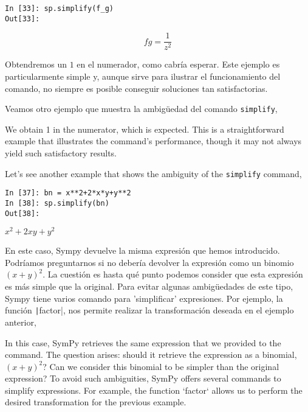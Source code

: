 \begin{center}
	\begin{minipage}{.25\textwidth}
		\begin{verbatim}
In [33]: sp.simplify(f_g)
Out[33]: 
		\end{verbatim}
	\end{minipage}
	\begin{equation*}
		fg = \frac{1}{z^2}
	\end{equation*}
\end{center}
\begin{paracol}{2}
Obtendremos un $1$ en el numerador, como cabría esperar. Este ejemplo es particularmente simple y, aunque sirve para ilustrar el funcionamiento del comando, no siempre es posible conseguir soluciones tan satisfactorias.

Veamos otro ejemplo que muestra la ambigüedad del comando \texttt{simplify},

\switchcolumn
We obtain 1 in the numerator, which is expected. This is a straightforward example that illustrates the command's performance, though it may not always yield such satisfactory results.

Let's see another example that shows the ambiguity of the \texttt{simplify} command,
\end{paracol}
\begin{center}
	\begin{minipage}{.25\textwidth}
		\begin{verbatim}
In [37]: bn = x**2+2*x*y+y**2
In [38]: sp.simplify(bn)
Out[38]:
		\end{verbatim}
		$x^2+2xy+y^2$
	\end{minipage}
\end{center}
\begin{paracol}{2}
En este caso, Sympy devuelve la misma expresión que hemos introducido. Podríamos preguntarnos si no debería devolver la expresión como un binomio $(x+y)^2$. La cuestión es hasta qué punto podemos consider que esta expresión es más simple que la original. Para evitar algunas ambigüedades de este tipo, Sympy tiene varios comando para 'simplificar' expresiones. Por ejemplo, la función \texttt|factor|, nos permite realizar la transformación deseada en el ejemplo anterior,

\switchcolumn
In this case, SymPy retrieves the same expression that we provided to the command. The question arises: should it retrieve the expression as a binomial, \((x+y)^2\)? Can we consider this binomial to be simpler than the original expression? To avoid such ambiguities, SymPy offers several commands to simplify expressions. For example, the function `factor` allows us to perform the desired transformation for the previous example.
\end{paracol}
